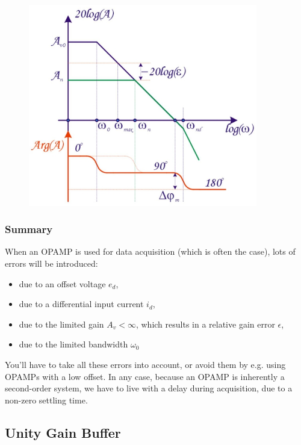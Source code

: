 \begin{figure}[h!]
	\centering
	\includegraphics[width=10cm]{figures/ch02/opamp11.jpg}
	\caption{}
	\label{fig:opamp11}
\end{figure}


\subsubsection{Summary}
When an OPAMP is used for data acquisition (which is often the case), lots of errors will be introduced:
\begin{itemize}
	\item due to an offset voltage $e_d$,
	\item due to a differential input current $i_d$,
	\item due to the limited gain $A_v < \infty$, which results in a relative gain error $\epsilon$,
	\item due to the limited bandwidth $\omega_0$
\end{itemize}
You'll have to take all these errors into account, or avoid them by e.g. using OPAMPs with a low offset. In any case, because an OPAMP is inherently a second-order system, we have to live with a delay during acquisition, due to a non-zero settling time.
\subsection{Unity Gain Buffer}
\label{sec:unity_gain_buffer}

